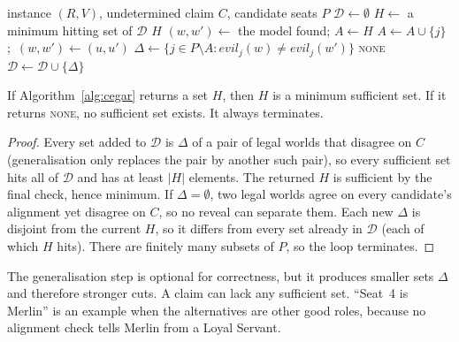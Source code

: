 \documentclass[runningheads]{llncs}
\newcommand{\evil}{\mathit{evil}}
\begin{document}
\begin{algorithm}[t]
\caption{Minimum reveal set by counterexample-guided implicit hitting sets}\label{alg:cegar}
\small
\begin{algorithmic}[1]
\Require instance $(R,V)$, undetermined claim $C$, candidate seats $P$
\State $\mathcal{D}\gets\emptyset$
\Loop
  \State $H\gets$ a minimum hitting set of $\mathcal{D}$ 
   \Return $H$ \EndIf
  \State $(w,w')\gets$ the model found; $A\gets H$
   
      \State $A\gets A\cup\{j\}$;\ $(w,w')\gets(u,u')$
    \EndIf
  \EndFor
  \State $\Delta\gets\{j\in P\setminus A:\evil_j(w)\ne\evil_j(w')\}$
  \If{$\Delta=\emptyset$} \Return \textsc{none} \EndIf
  \State $\mathcal{D}\gets\mathcal{D}\cup\{\Delta\}$
\EndLoop
\end{algorithmic}
\end{algorithm}

\begin{proposition}
If Algorithm~\ref{alg:cegar} returns a set $H$, then $H$ is a minimum sufficient set. If it returns \textup{\textsc{none}},
no sufficient set exists. It always terminates.
\end{proposition}
\begin{proof}
Every set added to $\mathcal{D}$ is $\Delta$ of a pair of legal worlds that disagree on $C$ (generalisation only
replaces the pair by another such pair), so every sufficient set hits all of $\mathcal{D}$ and has at least $|H|$
elements. The returned $H$ is sufficient by the final check, hence minimum. If $\Delta=\emptyset$, two legal worlds
agree on every candidate's alignment yet disagree on $C$, so no reveal can separate them. Each new $\Delta$ is
disjoint from the current $H$, so it differs from every set already in $\mathcal{D}$ (each of which $H$ hits). There
are finitely many subsets of $P$, so the loop terminates.
\end{proof}

\noindent The generalisation step is optional for correctness, but it produces smaller sets $\Delta$ and therefore
stronger cuts. A claim can lack any sufficient set. ``Seat~4 is Merlin'' is an example when the alternatives are other
good roles, because no alignment check tells Merlin from a Loyal Servant.
\end{document}
